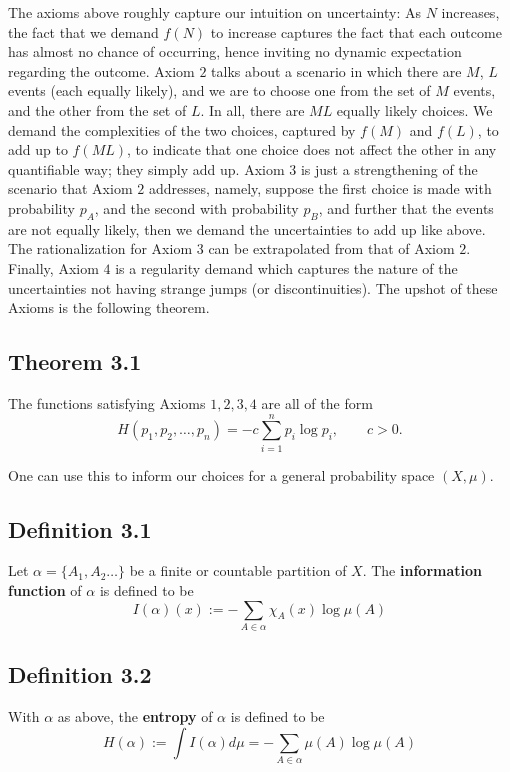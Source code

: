 \documentclass[11pt,a4paper]{article}
\begin{document}
The axioms above roughly capture our intuition on uncertainty: As $N$ increases, the fact that we demand $f(N)$ to increase captures the fact that each outcome has almost no chance of occurring, hence inviting no dynamic expectation regarding the outcome. Axiom $2$ talks about a scenario in which there are $M$, $L$ events (each equally likely), and we are to choose one from the set of $M$ events, and the other from the set of $L$. In all, there are $ML$ equally likely choices. We demand the complexities of the two choices, captured by $f(M)$ and $f(L)$, to add up to $f(ML)$, to indicate that one choice does not affect the other in any quantifiable way; they simply add up. Axiom $3$ is just a strengthening of the scenario that Axiom $2$ addresses, namely, suppose the first choice is made with probability $p_A$, and the second with probability $p_B$, and further that the events are not equally likely, then we demand the uncertainties to add up like above. The rationalization for Axiom $3$ can be extrapolated from that of Axiom $2$. Finally, Axiom $4$ is a regularity demand which captures the nature of the uncertainties not having strange jumps (or discontinuities). The upshot of these Axioms is the following theorem.
\subsection*{Theorem 3.1}
    The functions satisfying Axioms $1, 2, 3, 4$ are all of the form
    \[
    H(p_1, p_2, \ldots, p_n) = -c\sum_{i=1}^np_i\log{p_i},\qquad c>0.
    \]


One can use this to inform our choices for a general probability space $(X,\mu)$.
\subsection*{Definition 3.1}Let $\alpha = \{A_1, A_2\ldots\}$ be a finite or countable partition of $X$. The \textbf{information function} of $\alpha$ is defined to be
$$I(\alpha)(x):= -\sum_{A\in \alpha}\chi_A(x)\log{\mu(A)}$$

\subsection*{Definition 3.2}
    With $\alpha$ as above, the \textbf{entropy} of $\alpha$ is defined to be
    \[
    H(\alpha):= \int I(\alpha)d\mu = -\sum_{A\in \alpha}\mu(A)\log{\mu(A)}
    \]
\end{document}
